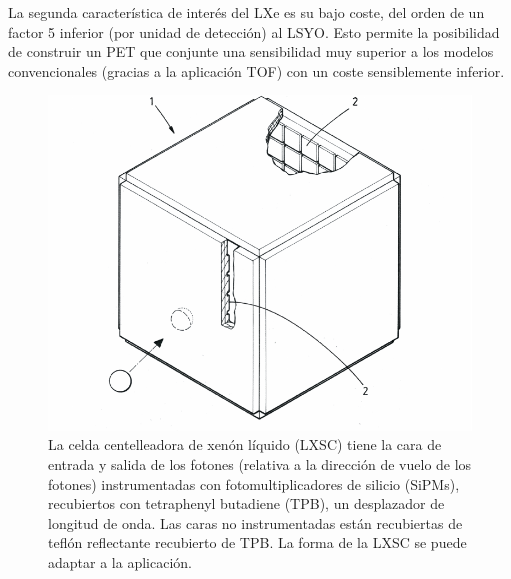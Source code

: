 La segunda característica de interés del LXe es su bajo coste, del orden de un factor 5 inferior (por unidad de detección) al LSYO. Esto permite la posibilidad de construir un PET que conjunte una sensibilidad muy superior a los modelos convencionales (gracias a la aplicación TOF) con un coste sensiblemente inferior. 

\begin{figure}[!htbp]
	\centering
	\includegraphics[scale=0.6]{img/LXSC2.pdf}
	\caption{\label{fig.box} La celda centelleadora de xenón líquido (LXSC) tiene la cara de entrada y salida de los fotones (relativa a la dirección de vuelo de los fotones) instrumentadas con fotomultiplicadores de silicio (SiPMs), recubiertos con tetraphenyl butadiene (TPB), un desplazador de longitud de onda. Las caras no instrumentadas están recubiertas de teflón reflectante recubierto de TPB. La forma de la LXSC se puede adaptar a la aplicación.}
\end{figure}


